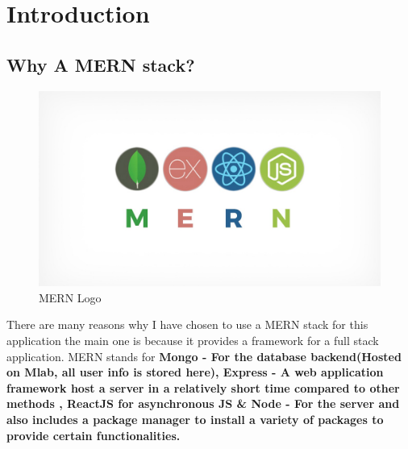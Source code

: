 \chapter{Introduction}
\section {Why A MERN stack?}
\begin{center}
  \begin{figure}[h!]
    \includegraphics[width=\textwidth]{img/mern.jpeg}
    \caption{MERN Logo}
    \label{fig: Image of MERN stack logo}
  \end{figure}
\end{center}
There are many reasons why I have chosen to use a MERN stack for this
application the main one is because it provides a framework for a full stack
application.
MERN stands for \textbf{Mongo - For the database backend(Hosted on Mlab, all user info is stored here),
Express - A web application framework
host a server in a relatively short time compared to other methods
, ReactJS for asynchronous JS \& Node - For the server and also includes a package manager to install a variety of packages to provide certain functionalities.}
\cite{MERN}
\\
